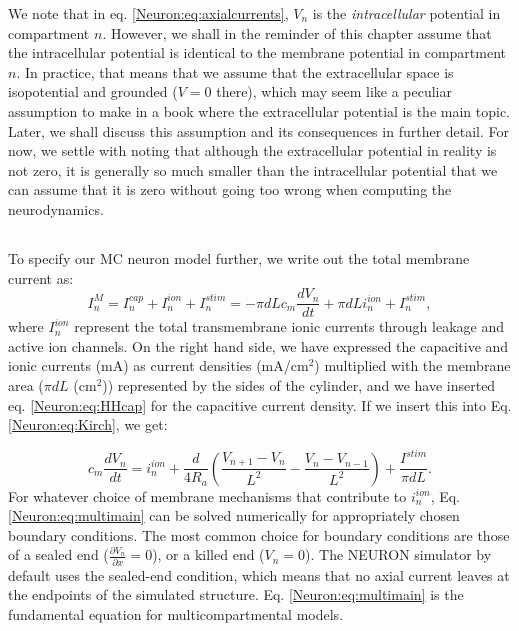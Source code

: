 We note that in eq. \ref{Neuron:eq:axialcurrents}, $V_n$ is the \emph{intracellular} potential in compartment $n$. However,  we shall in the reminder of this chapter assume that the intracellular potential is identical to the membrane potential in compartment $n$. In practice, that means that we assume that the extracellular space is isopotential and grounded ($V = 0$ there), which may seem like a peculiar assumption to make in a book where the extracellular potential is the main topic. Later, we shall discuss this assumption and its consequences in further detail. For now, we settle with noting that although the extracellular potential in reality is not zero, it is generally so much smaller than the intracellular potential that we can assume that it is zero without going too wrong when computing the neurodynamics. 



\subsection{}
\label{sec:Neuron:Active_multicomp}

To specify our MC neuron model further, we write out the total membrane current as:
\begin{equation}
I^M_n = I_n^{cap} + I_n^{ion} + I_n^{stim} = -\pi d L c_m \frac{dV_n}{dt} + \pi d L i_n^{ion} + I_n^{stim}, 
\label{Neuron:eq:Imemb}
\end{equation}
where $I_n^{ion}$ represent the total transmembrane ionic currents through leakage and active ion channels. On the right hand side, we have expressed the capacitive and ionic currents (mA) as current densities (mA/cm$^2$) multiplied with the membrane area ($\pi d L$ (cm$^2$)) represented by the sides of the cylinder, and we have inserted eq. \ref{Neuron:eq:HHcap} for the capacitive current density. If we insert this into Eq. \ref{Neuron:eq:Kirch}, we get:

\begin{equation}
c_m \frac{dV_n}{dt} = i_n^{ion} + \frac{d}{4R_a}\left(\frac{V_{n+1}-V_n}{L^2} - \frac{V_n-V_{n-1}}{L^2} \right) + \frac{I^{stim}}{\pi d L}.
\label{Neuron:eq:multimain}
\end{equation}
For whatever choice of membrane mechanisms that contribute to $i_n^{ion}$, Eq. \ref{Neuron:eq:multimain} can be solved numerically for appropriately chosen boundary conditions. The most common choice for boundary conditions are those of a sealed end ($\frac{\partial V_n}{\partial x} = 0$), or a killed end ($V_n=0$). The NEURON simulator by default uses the sealed-end condition, which means that no axial current leaves at the endpoints of the simulated structure. Eq. \ref{Neuron:eq:multimain} is the fundamental equation for multicompartmental models.



